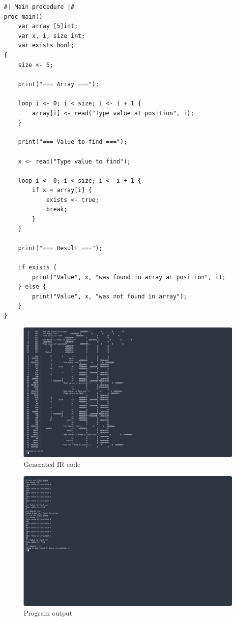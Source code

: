 \begin{verbatim}
#| Main procedure |#
proc main()
    var array [5]int;
    var x, i, size int;
    var exists bool;
{
    size <- 5;

    print("=== Array ===");

    loop i <- 0; i < size; i <- i + 1 {
        array[i] <- read("Type value at position", i);
    }

    print("=== Value to find ===");

    x <- read("Type value to find");

    loop i <- 0; i < size; i <- i + 1 {
        if x = array[i] {
            exists <- true;
            break;
        }
    }

    print("=== Result ===");

    if exists {
        print("Value", x, "was found in array at position", i);
    } else {
        print("Value", x, "was not found in array");
    }
}
\end{verbatim}

\begin{figure}[H]
    \centering
    \caption{Generated IR code}
    \includegraphics[width=\textwidth]{evidences/find_ir}
\end{figure}

\begin{figure}[H]
    \centering
    \caption{Program output}
    \includegraphics[width=\textwidth]{evidences/find_output}
\end{figure}

